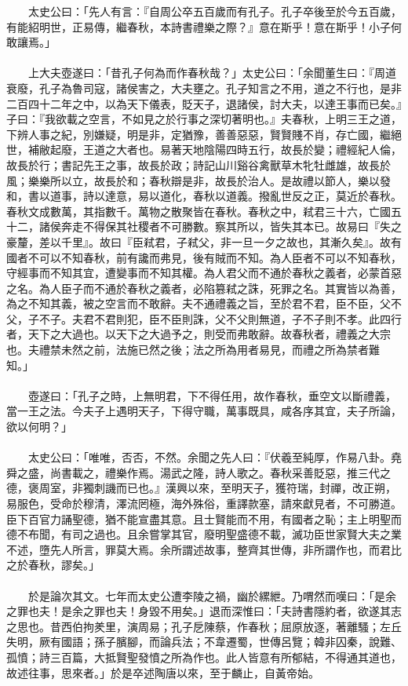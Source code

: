 　　太史公曰：「先人有言：『自周公卒五百歲而有孔子。孔子卒後至於今五百歲，有能紹明世，正易傳，繼春秋，本詩書禮樂之際？』意在斯乎！意在斯乎！小子何敢讓焉。」
\\\\
　　上大夫壺遂曰：「昔孔子何為而作春秋哉？」太史公曰：「余聞董生曰：『周道衰廢，孔子為魯司寇，諸侯害之，大夫壅之。孔子知言之不用，道之不行也，是非二百四十二年之中，以為天下儀表，貶天子，退諸侯，討大夫，以達王事而已矣。』子曰：『我欲載之空言，不如見之於行事之深切著明也。』夫春秋，上明三王之道，下辨人事之紀，別嫌疑，明是非，定猶豫，善善惡惡，賢賢賤不肖，存亡國，繼絕世，補敝起廢，王道之大者也。易著天地陰陽四時五行，故長於變；禮經紀人倫，故長於行；書記先王之事，故長於政；詩記山川谿谷禽獸草木牝牡雌雄，故長於風；樂樂所以立，故長於和；春秋辯是非，故長於治人。是故禮以節人，樂以發和，書以道事，詩以達意，易以道化，春秋以道義。撥亂世反之正，莫近於春秋。春秋文成數萬，其指數千。萬物之散聚皆在春秋。春秋之中，弒君三十六，亡國五十二，諸侯奔走不得保其社稷者不可勝數。察其所以，皆失其本已。故易曰『失之豪釐，差以千里』。故曰『臣弒君，子弒父，非一旦一夕之故也，其漸久矣』。故有國者不可以不知春秋，前有讒而弗見，後有賊而不知。為人臣者不可以不知春秋，守經事而不知其宜，遭變事而不知其權。為人君父而不通於春秋之義者，必蒙首惡之名。為人臣子而不通於春秋之義者，必陷篡弒之誅，死罪之名。其實皆以為善，為之不知其義，被之空言而不敢辭。夫不通禮義之旨，至於君不君，臣不臣，父不父，子不子。夫君不君則犯，臣不臣則誅，父不父則無道，子不子則不孝。此四行者，天下之大過也。以天下之大過予之，則受而弗敢辭。故春秋者，禮義之大宗也。夫禮禁未然之前，法施已然之後；法之所為用者易見，而禮之所為禁者難知。」
\\\\
　　壺遂曰：「孔子之時，上無明君，下不得任用，故作春秋，垂空文以斷禮義，當一王之法。今夫子上遇明天子，下得守職，萬事既具，咸各序其宜，夫子所論，欲以何明？」
\\\\
　　太史公曰：「唯唯，否否，不然。余聞之先人曰：『伏羲至純厚，作易八卦。堯舜之盛，尚書載之，禮樂作焉。湯武之隆，詩人歌之。春秋采善貶惡，推三代之德，褒周室，非獨刺譏而已也。』漢興以來，至明天子，獲符瑞，封禪，改正朔，易服色，受命於穆清，澤流罔極，海外殊俗，重譯款塞，請來獻見者，不可勝道。臣下百官力誦聖德，猶不能宣盡其意。且士賢能而不用，有國者之恥；主上明聖而德不布聞，有司之過也。且余嘗掌其官，廢明聖盛德不載，滅功臣世家賢大夫之業不述，墮先人所言，罪莫大焉。余所謂述故事，整齊其世傳，非所謂作也，而君比之於春秋，謬矣。」
\\\\
　　於是論次其文。七年而太史公遭李陵之禍，幽於縲紲。乃喟然而嘆曰：「是余之罪也夫！是余之罪也夫！身毀不用矣。」退而深惟曰：「夫詩書隱約者，欲遂其志之思也。昔西伯拘羑里，演周易；孔子戹陳蔡，作春秋；屈原放逐，著離騷；左丘失明，厥有國語；孫子臏腳，而論兵法；不韋遷蜀，世傳呂覽；韓非囚秦，說難、孤憤；詩三百篇，大抵賢聖發憤之所為作也。此人皆意有所郁結，不得通其道也，故述往事，思來者。」於是卒述陶唐以來，至于麟止，自黃帝始。
